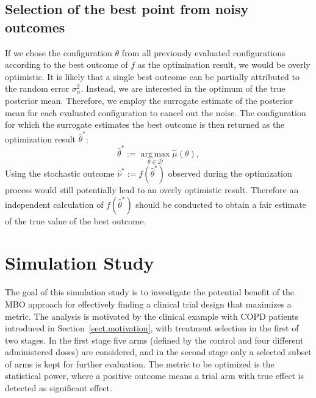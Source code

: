 \documentclass[bimj,fleqn]{w-art}
\theoremstyle{plain}
\theoremstyle{definition}
\begin{document}
\subsection{Selection of the best point from noisy outcomes}
\label{ssec:best_point}
If we chose the configuration $\theta$ from all previously evaluated configurations according to the best outcome of $f$ as the optimization result, we would be overly optimistic.
It is likely that a single best outcome can be partially attributed to the random error $\sigma_{n}^2$.
Instead, we are interested in the optimum of the true posterior mean.
Therefore, we employ the surrogate estimate of the posterior mean for each evaluated configuration to cancel out the noise.
The configuration for which the surrogate estimates the best outcome is then returned as the optimization result $\hat{\theta}^\ast$:
\begin{equation}
  \hat{\theta}^{\ast} := \operatorname{arg\,max}\limits_{\theta \in \mathcal{D}} \hat{\mu}(\theta),
\end{equation}
Using the stochastic outcome $\hat{\nu}^\ast := f(\hat{\theta}^\ast) $ observed during the optimization process would still potentially lead to an overly optimistic result.
Therefore an independent calculation of $f(\hat{\theta}^\ast)$ should be conducted to obtain a fair estimate of the true value of the best outcome.

\clearpage

\section{Simulation Study}
\label{sec:simulation_study}


The goal of this simulation study is to investigate the potential benefit of the MBO approach for effectively finding a clinical trial design that maximizes a metric.
The analysis is motivated by the clinical example with COPD patients introduced in Section~\ref{sect.motivation}, with treatment selection in the first of two stages.
In the first stage five arms (defined by the control and four different administered doses) are considered, and in the second stage only a selected subset of arms is kept for further evaluation. 
The metric to be optimized is the statistical power, where a positive outcome means a trial arm with true effect is detected as significant effect.
\end{document}
